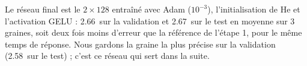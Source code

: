 Le réseau final est le $2\times128$ entraîné avec Adam ($10^{-3}$), l'initialisation de He et l'activation GELU :
\num{2.66}\pb\ sur la validation et \num{2.67}\pb\ sur le test en moyenne sur 3 graines, soit deux fois moins
d'erreur que la référence de l'étape 1, pour le même temps de réponse. Nous gardons la graine la plus précise sur
la validation (\num{2.58}\pb\ sur le test) ; c'est ce réseau qui sert dans la suite.
